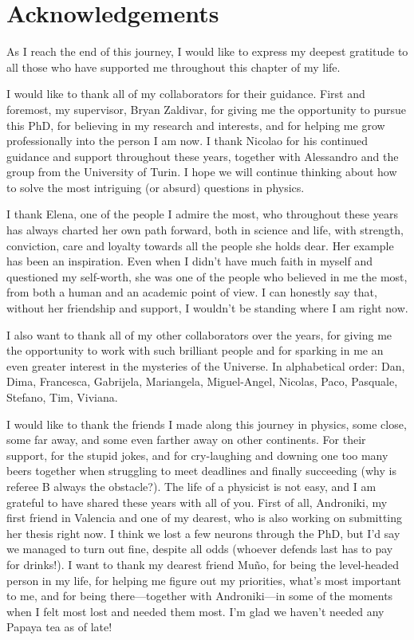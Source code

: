 \chapter*{Acknowledgements}

As I reach the end of this journey, I would like to express my deepest gratitude to all those who have supported me throughout this chapter of my life.

I would like to thank all of my collaborators for their guidance. 
First and foremost, my supervisor, Bryan Zaldivar, for giving me the opportunity to pursue this PhD, for believing in my research and interests, and for helping me grow professionally into the person I am now.
I thank Nicolao for his continued guidance and support throughout these years, together with Alessandro and the group from the University of Turin. I hope we will continue thinking about how to solve the most intriguing (or absurd) questions in physics.

I thank Elena, one of the people I admire the most, who throughout these years has always charted her own path forward, both in science and life, with strength, conviction, care and loyalty towards all the people she holds dear. Her example has been an inspiration.
Even when I didn't have much faith in myself and questioned my self-worth, she was one of the people who believed in me the most, from both a human and an academic point of view. I can honestly say that, without her friendship and support, I wouldn't be standing where I am right now.

I also want to thank all of my other collaborators over the years, for giving me the opportunity to work with such brilliant people and for sparking in me an even greater interest in the mysteries of the Universe.
In alphabetical order:
Dan, 
Dima, 
Francesca, 
Gabrijela, 
Mariangela,
Miguel-Angel,
Nicolas,  
Paco, 
Pasquale,
Stefano, 
Tim, 
Viviana.

I would like to thank the friends I made along this journey in physics, some close, some far away, and some even farther away on other continents. For their support, for the stupid jokes, and for cry-laughing and downing one too many beers together when struggling to meet deadlines and finally succeeding (why is referee B always the obstacle?). The life of a physicist is not easy, and I am grateful to have shared these years with all of you.
First of all, Androniki, my first friend in Valencia and one of my dearest, who is also working on submitting her thesis right now. I think we lost a few neurons through the PhD, but I'd say we managed to turn out fine, despite all odds (whoever defends last has to pay for drinks!).
I want to thank my dearest friend Muño, for being the level-headed person in my life, for helping me figure out my priorities, what's most important to me, and for being there---together with Androniki---in some of the moments when I felt most lost and needed them most. I'm glad we haven't needed any Papaya tea as of late!

